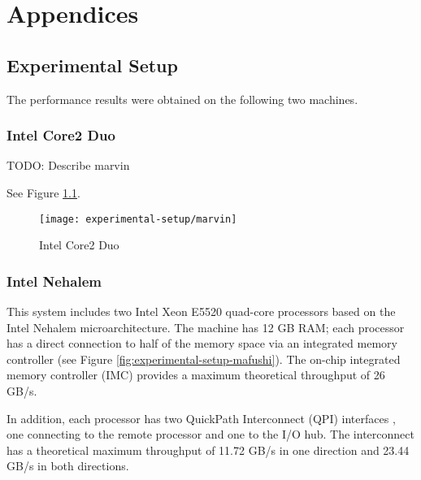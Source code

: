 
\part{Appendices}
\label{part:appendices}

\chapter{Experimental Setup}
\label{chap:experimental-setup}

The performance results were obtained on the following two machines.

\section{Intel Core2 Duo}
\label{sec:experimental-setup-marvin}

TODO: Describe marvin

See Figure \ref{fig:experimental-setup-marvin}.

\begin{figure}[htb]
  \centering
  \texttt{[image: experimental-setup/marvin]}
  \caption[Intel Core2 Duo]{Intel Core2 Duo}
  \label{fig:experimental-setup-marvin}
\end{figure}

\section{Intel Nehalem}
\label{sec:experimental-setup-mafushi}

This system includes two Intel Xeon E5520 quad-core processors based
on the Intel Nehalem microarchitecture. The machine has 12 GB RAM;
each processor has a direct connection to half of the memory space via
an integrated memory controller (see Figure
\ref{fig:experimental-setup-mafushi}). The on-chip integrated memory
controller (IMC) provides a maximum theoretical throughput of 26 GB/s.

In addition, each processor has two QuickPath Interconnect (QPI)
interfaces \cite{R.A.MaddoxG.Singh2009}, one connecting to the remote
processor and one to the I/O hub. The interconnect has a theoretical
maximum throughput of 11.72 GB/s in one direction and 23.44 GB/s in
both directions.

